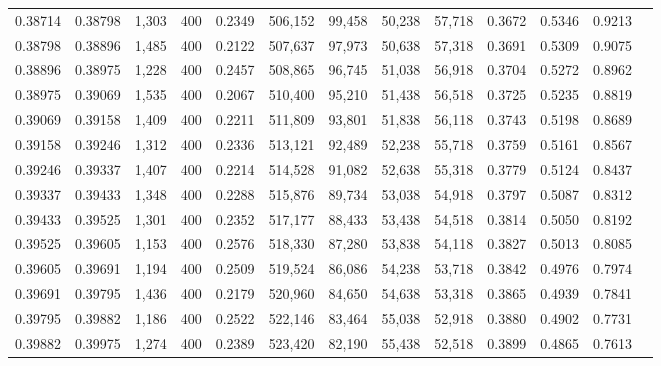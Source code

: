 \begin{tabular}{rrrrrrrrrrrrr}
0.38714 & 0.38798 &  1,303 &   400 &                                     0.2349 & 506,152 &  99,458 &  50,238 &  57,718 & 0.3672 & 0.5346 & 0.9213 \\
0.38798 & 0.38896 &  1,485 &   400 &                                     0.2122 & 507,637 &  97,973 &  50,638 &  57,318 & 0.3691 & 0.5309 & 0.9075 \\
0.38896 & 0.38975 &  1,228 &   400 &                                     0.2457 & 508,865 &  96,745 &  51,038 &  56,918 & 0.3704 & 0.5272 & 0.8962 \\
0.38975 & 0.39069 &  1,535 &   400 &                                     0.2067 & 510,400 &  95,210 &  51,438 &  56,518 & 0.3725 & 0.5235 & 0.8819 \\
0.39069 & 0.39158 &  1,409 &   400 &                                     0.2211 & 511,809 &  93,801 &  51,838 &  56,118 & 0.3743 & 0.5198 & 0.8689 \\
0.39158 & 0.39246 &  1,312 &   400 &                                     0.2336 & 513,121 &  92,489 &  52,238 &  55,718 & 0.3759 & 0.5161 & 0.8567 \\
0.39246 & 0.39337 &  1,407 &   400 &                                     0.2214 & 514,528 &  91,082 &  52,638 &  55,318 & 0.3779 & 0.5124 & 0.8437 \\
0.39337 & 0.39433 &  1,348 &   400 &                                     0.2288 & 515,876 &  89,734 &  53,038 &  54,918 & 0.3797 & 0.5087 & 0.8312 \\
0.39433 & 0.39525 &  1,301 &   400 &                                     0.2352 & 517,177 &  88,433 &  53,438 &  54,518 & 0.3814 & 0.5050 & 0.8192 \\
0.39525 & 0.39605 &  1,153 &   400 &                                     0.2576 & 518,330 &  87,280 &  53,838 &  54,118 & 0.3827 & 0.5013 & 0.8085 \\
0.39605 & 0.39691 &  1,194 &   400 &                                     0.2509 & 519,524 &  86,086 &  54,238 &  53,718 & 0.3842 & 0.4976 & 0.7974 \\
0.39691 & 0.39795 &  1,436 &   400 &                                     0.2179 & 520,960 &  84,650 &  54,638 &  53,318 & 0.3865 & 0.4939 & 0.7841 \\
0.39795 & 0.39882 &  1,186 &   400 &                                     0.2522 & 522,146 &  83,464 &  55,038 &  52,918 & 0.3880 & 0.4902 & 0.7731 \\
0.39882 & 0.39975 &  1,274 &   400 &                                     0.2389 & 523,420 &  82,190 &  55,438 &  52,518 & 0.3899 & 0.4865 & 0.7613 \\

\end{tabular}
